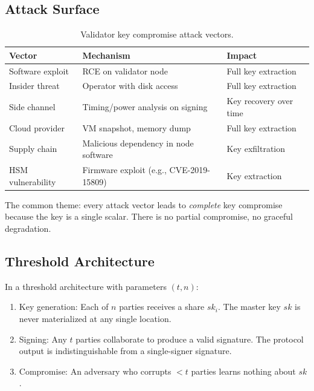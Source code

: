 \documentclass[11pt,a4paper]{article}
\begin{document}
\subsection{Attack Surface}

\begin{table}[ht]
\centering
\caption{Validator key compromise attack vectors.}
\label{tab:attack-vectors}
\begin{tabular}{lll}
\toprule
\textbf{Vector} & \textbf{Mechanism} & \textbf{Impact} \\
\midrule
Software exploit & RCE on validator node & Full key extraction \\
Insider threat & Operator with disk access & Full key extraction \\
Side channel & Timing/power analysis on signing & Key recovery over time \\
Cloud provider & VM snapshot, memory dump & Full key extraction \\
Supply chain & Malicious dependency in node software & Key exfiltration \\
HSM vulnerability & Firmware exploit (e.g., CVE-2019-15809) & Key extraction \\
\bottomrule
\end{tabular}
\end{table}

The common theme: every attack vector leads to \emph{complete} key compromise because
the key is a single scalar. There is no partial compromise, no graceful degradation.

\subsection{Threshold Architecture}

In a threshold architecture with parameters $(t, n)$:

\begin{enumerate}[leftmargin=2em]
  \item Key generation: Each of $n$ parties receives a share $sk_i$. The master key
        $sk$ is never materialized at any single location.
  \item Signing: Any $t$ parties collaborate to produce a valid signature. The protocol
        output is indistinguishable from a single-signer signature.
  \item Compromise: An adversary who corrupts $< t$ parties learns nothing about $sk$.
\end{enumerate}
\end{document}
